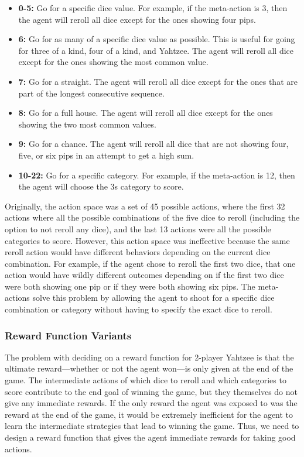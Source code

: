 \documentclass[12pt]{article}
\begin{document}
\begin{itemize}
    \item \textbf{0-5:} Go for a specific dice value. For example, if the meta-action is 3, then the agent will reroll all dice except for the ones showing four pips.
    \item \textbf{6:} Go for as many of a specific dice value as possible. This is useful for going for three of a kind, four of a kind, and Yahtzee. The agent will reroll all dice except for the ones showing the most common value.
    \item \textbf{7:} Go for a straight. The agent will reroll all dice except for the ones that are part of the longest consecutive sequence.
    \item \textbf{8:} Go for a full house. The agent will reroll all dice except for the ones showing the two most common values.
    \item \textbf{9:} Go for a chance. The agent will reroll all dice that are not showing four, five, or six pips in an attempt to get a high sum.
    \item \textbf{10-22:} Go for a specific category. For example, if the meta-action is 12, then the agent will choose the 3s category to score.
\end{itemize}

\noindent
Originally, the action space was a set of 45 possible actions, where the first 32 actions where all the possible combinations of the five dice to reroll (including the option to not reroll any dice), and the last 13 actions were all the possible categories to score. However, this action space was ineffective because the same reroll action would have different behaviors depending on the current dice combination. For example, if the agent chose to reroll the first two dice, that one action would have wildly different outcomes depending on if the first two dice were both showing one pip or if they were both showing six pips. The meta-actions solve this problem by allowing the agent to shoot for a specific dice combination or category without having to specify the exact dice to reroll.

\subsubsection{Reward Function Variants}
The problem with deciding on a reward function for 2-player Yahtzee is that the ultimate reward—whether or not the agent won—is only given at the end of the game. The intermediate actions of which dice to reroll and which categories to score contribute to the end goal of winning the game, but they themselves do not give any immediate rewards. If the only reward the agent was exposed to was the reward at the end of the game, it would be extremely inefficient for the agent to learn the intermediate strategies that lead to winning the game. Thus, we need to design a reward function that gives the agent immediate rewards for taking good actions.
\end{document}
